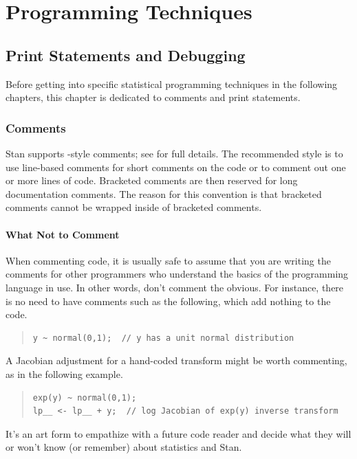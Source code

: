\part{Programming Techniques}\label{programming-techniques.part}


\chapter{Print Statements and Debugging}

\noindent
Before getting into specific statistical programming techniques
in the following chapters, this chapter is dedicated to comments
and print statements.

\section{Comments}

Stan supports \Cpp-style comments; see  for full
details.  The recommended style is to use line-based comments for
short comments on the code or to comment out one or more
lines of code.  Bracketed comments are then reserved for long
documentation comments.  The reason for this convention is that
bracketed comments cannot be wrapped inside of bracketed comments.

\subsection{What Not to Comment}

When commenting code, it is usually safe to assume that you are 
writing the comments for other programmers who understand the basics 
of the programming language in use.  In other words, don't comment the
obvious.  For instance, there is no need to have comments
such as the following, which add nothing to the code.
%
\begin{quote}
\begin{Verbatim}
y ~ normal(0,1);  // y has a unit normal distribution
\end{Verbatim}
\end{quote}
%
A Jacobian adjustment for a hand-coded transform might be worth
commenting, as in the following example.
%
\begin{quote}
\begin{Verbatim}
exp(y) ~ normal(0,1);
lp__ <- lp__ + y;  // log Jacobian of exp(y) inverse transform
\end{Verbatim}
\end{quote}
%
It's an art form to empathize with a future code reader and decide
what they will or won't know (or remember) about statistics and Stan.

